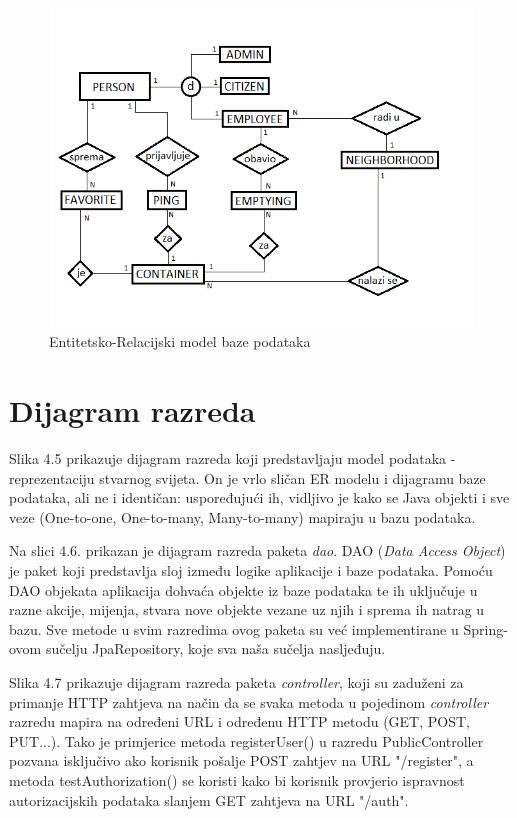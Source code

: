 				\begin{figure}[H]
					\includegraphics[scale=0.8]{figures/er_model.PNG}
					\centering
					\caption{Entitetsko-Relacijski model baze podataka}
					\label{fig:er-model}
				\end{figure}
			
			\eject
			
			
		\section{Dijagram razreda}
		
			Slika 4.5 prikazuje dijagram razreda koji predstavljaju model podataka - reprezentaciju stvarnog svijeta. On je vrlo sličan ER modelu i dijagramu baze podataka, ali ne i identičan: uspoređujući ih, vidljivo je kako se Java objekti i sve veze (One-to-one, One-to-many, Many-to-many) mapiraju u bazu podataka.
			
			Na slici 4.6. prikazan je dijagram razreda paketa \textit{dao}. DAO (\textit{Data Access Object}) je paket koji predstavlja sloj između logike aplikacije i baze podataka. Pomoću DAO objekata aplikacija dohvaća objekte iz baze podataka te ih uključuje u razne akcije, mijenja, stvara nove objekte vezane uz njih i sprema ih natrag u bazu. Sve metode u svim razredima ovog paketa su već implementirane u Spring-ovom sučelju JpaRepository, koje sva naša sučelja nasljeđuju.
			
			Slika 4.7 prikazuje dijagram razreda paketa \textit{controller}, koji su zaduženi za primanje HTTP zahtjeva na način da se svaka metoda u pojedinom \textit{controller} razredu mapira na određeni URL i određenu HTTP metodu (GET, POST, PUT...). Tako je primjerice metoda registerUser() u razredu PublicController pozvana isključivo ako korisnik pošalje POST zahtjev na URL "/register", a metoda testAuthorization() se koristi kako bi korisnik provjerio ispravnost autorizacijskih podataka slanjem GET zahtjeva na URL "/auth". 
			
